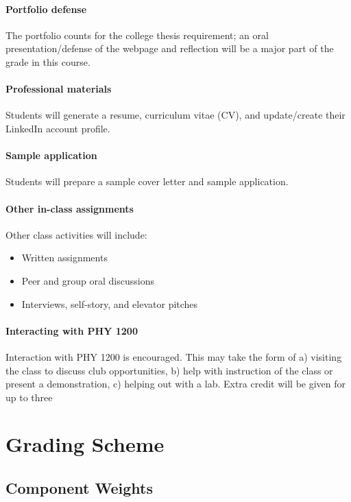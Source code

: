 \documentclass{syllabus}
\begin{document}
\paragraph{Portfolio defense}
The portfolio counts for the college thesis requirement; an oral presentation/defense of the webpage and reflection will be a major part of the grade in this course.

\paragraph{Professional materials}
Students will generate a resume, curriculum vitae (CV), and update/create their LinkedIn account profile.

\paragraph{Sample application}
Students will prepare a sample cover letter and sample application.

\paragraph{Other in-class assignments}
Other class activities will include: 
\begin{itemize}
    \item Written assignments
    \item Peer and group oral discussions
    \item Interviews, self-story, and elevator pitches
\end{itemize}

\paragraph{Interacting with PHY 1200} Interaction with PHY 1200 is encouraged. This may take the form of a) visiting the class to discuss club opportunities, b) help with instruction of the class or present a demonstration, c) helping out with a lab. Extra credit will be given for up to three 


\section*{Grading Scheme}
\subsection*{Component Weights}
\end{document}

